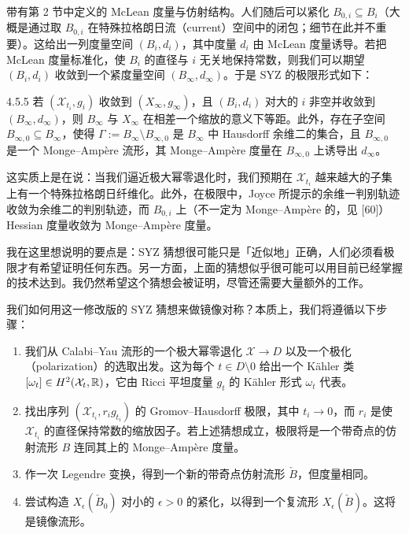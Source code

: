 带有第 2 节中定义的 McLean 度量与仿射结构。人们随后可以紧化 $B_{0,i}\subseteq B_i$（大概是通过取 $B_{0,i}$ 在特殊拉格朗日流（current）空间中的闭包；细节在此并不重要）。这给出一列度量空间 $(B_i,d_i)$，其中度量 $d_i$ 由 McLean 度量诱导。若把 McLean 度量标准化，使 $B_i$ 的直径与 $i$ 无关地保持常数，则我们可以期望 $(B_i,d_i)$ 收敛到一个紧度量空间 $(B_\infty,d_\infty)$。于是 SYZ 的极限形式如下：

\begin{conjecture}{4.5.5}
若 $(\mathcal{X}_{t_i},g_i)$ 收敛到 $(X_\infty,g_\infty)$，且 $(B_i,d_i)$ 对大的 $i$ 非空并收敛到 $(B_\infty,d_\infty)$，则 $B_\infty$ 与 $X_\infty$ 在相差一个缩放的意义下等距。此外，存在子空间 $B_{\infty,0}\subseteq B_\infty$，使得 $\Gamma:=B_\infty\setminus B_{\infty,0}$ 是 $B_\infty$ 中 Hausdorff 余维二的集合，且 $B_{\infty,0}$ 是一个 Monge--Ampère 流形，其 Monge--Ampère 度量在 $B_{\infty,0}$ 上诱导出 $d_\infty$。
\end{conjecture}

这实质上是在说：当我们逼近极大幂零退化时，我们预期在 $\mathcal{X}_{t_i}$ 越来越大的子集上有一个特殊拉格朗日纤维化。此外，在极限中，Joyce 所提示的余维一判别轨迹收敛为余维二的判别轨迹，而 $B_{0,i}$ 上（不一定为 Monge--Ampère 的，见 [60]）Hessian 度量收敛为 Monge--Ampère 度量。

我在这里想说明的要点是：SYZ 猜想很可能只是「近似地」正确，人们必须看极限才有希望证明任何东西。另一方面，上面的猜想似乎很可能可以用目前已经掌握的技术达到。我仍然希望这个猜想会被证明，尽管还需要大量额外的工作。

我们如何用这一修改版的 SYZ 猜想来做镜像对称？本质上，我们将遵循以下步骤：
\begin{enumerate}
\item 我们从 Calabi--Yau 流形的一个极大幂零退化 $\mathcal{X}\to D$ 以及一个极化（polarization）的选取出发。这为每个 $t\in D\setminus0$ 给出一个 Kähler 类 $[\omega_t]\in H^2(\mathcal{X}_t,\mathbb{R})$，它由 Ricci 平坦度量 $g_t$ 的 Kähler 形式 $\omega_t$ 代表。
\item 找出序列 $(\mathcal{X}_{t_i},r_ig_{t_i})$ 的 Gromov--Hausdorff 极限，其中 $t_i\to0$，而 $r_i$ 是使 $\mathcal{X}_{t_i}$ 的直径保持常数的缩放因子。若上述猜想成立，极限将是一个带奇点的仿射流形 $B$ 连同其上的 Monge--Ampère 度量。
\item 作一次 Legendre 变换，得到一个新的带奇点仿射流形 $\check B$，但度量相同。
\item 尝试构造 $X_\epsilon(\check B_0)$ 对小的 $\epsilon>0$ 的紧化，以得到一个复流形 $X_\epsilon(\check B)$。这将是镜像流形。
\end{enumerate}

